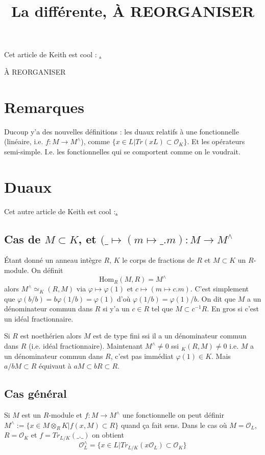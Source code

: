 \documentclass[a4paper,12pt]{book}
\title{La différente, À REORGANISER}
\date{}
\newcommand{\Or}{\mathcal{O}}
\newcommand{\Hom}{\textrm{Hom}}
\theoremstyle{plain}
\theoremstyle{definition}
\theoremstyle{remark}
\begin{document}
\maketitle
Cet article de Keith est cool : \href{https://kconrad.math.uconn.edu/blurbs/gradnumthy/different.pdf}.

À REORGANISER
\section{Remarques}
Ducoup y'a des nouvelles définitions : les duaux relatifs à
une fonctionnelle (linéaire, i.e. $f\colon M\to M^\wedge$), comme 
$\{x\in L|Tr(xL)\subset \Or_K\}$. Et les opérateurs semi-simple.
I.e. les fonctionnelles qui se comportent comme on le voudrait.

\section{Duaux}
Cet autre article de Keith est cool :\href{https://kconrad.math.uconn.edu/blurbs/linmultialg/dualmod.pdf}.

\subsection{Cas de $M\subset K$, et $(\_\mapsto (m\mapsto \_.m)\colon M\to M^\wedge$}
Étant donné un anneau intègre $R$, $K$ le corps de fractions de
$R$ et $M\subset K$ un $R$-module. On définit
\[\Hom_R(M,R)=M^\wedge\]
alors $M^\wedge\simeq _K(R,M)$ via $\varphi\mapsto \varphi(1)$
et $c\mapsto (m\mapsto c.m)$. C'est simplement que $\varphi(b/b)=
b\varphi(1/b)=\varphi(1)$ d'où $\varphi(1/b)=\varphi(1)/b$. On dit
que $M$ a un dénominateur commun dans $R$ si y'a un $c\in R$ tel
que $M\subset c^{-1}R$.
En gros si c'est un idéal fractionnaire.

Si $R$ est noethérien alors $M$ est de type fini ssi il a un
dénominateur commun dans $R$ (i.e. idéal fractionnaire).
Maintenant $M^\wedge\ne 0$ ssi $_K(R,M)\ne 0$ i.e. $M$ a un
dénominateur commun dans $R$, c'est pas immédiat $\varphi(1)\in K$.
Mais $a/bM\subset R$ équivaut à $aM\subset bR\subset R$.
\subsection{Cas général}
Si $M$ est un $R$-module et $f\colon M\to M^\wedge$ une fonctionnelle
on peut définir $M^\wedge:=\{x\in M\otimes_R K| f(x,M)\subset R\}$
quand ça fait sens. Dans le cas où $M=\Or_L$, $R=\Or_K$ et $f=Tr_{L/K}(\_.\_)$
on obtient
\[\Or_L^\wedge=\{x\in L| Tr_{L/K}(x\Or_L)\subset \Or_K\}\]
\end{document}
